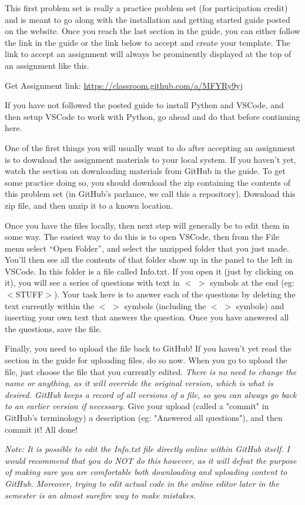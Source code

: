 \documentclass[letterpaper,12pt]{exam}
\begin{document}
	This first problem set is really a practice problem set (for participation credit) and is meant to go along with the installation and getting started guide posted on the website. Once you reach the last section in the guide, you can either follow the link in the guide or the link below to accept and create your template. The link to accept an assignment will always be prominently displayed at the top of an assignment like this.
	\begin{center}
		Get Assignment link: \url{https://classroom.github.com/a/MFYRy9yj}
	\end{center}
\begin{questions}
	\begin{question}
		If you have not followed the posted guide to install Python and VSCode, and then setup VSCode to work with Python, go ahead and do that before continuing here.

One of the first things you will usually want to do after accepting an assignment is to download the assignment materials to your local system. If you haven't yet, watch the section on downloading materials from GitHub in the guide. To get some practice doing so, you should download the zip containing the contents of this problem set (in GitHub's parlance, we call this a repository). Download this zip file, and then unzip it to a known location.

Once you have the files locally, then next step will generally be to edit them in some way. The easiest way to do this is to open VSCode, then from the File menu select ``Open Folder'', and select the unzipped folder that you just made. You'll then see all the contents of that folder show up in the panel to the left in VSCode. In this folder is a file called Info.txt. If you open it (just by clicking on it), you will see a series of questions with text in $<$ $>$ symbols at the end (eg: $<$STUFF$>$). Your task here is to answer each of the questions by deleting the text currently within the $<$ $>$ symbols (including the $<$ $>$ symbols) and inserting your own text that answers the question. Once you have answered all the questions, save the file.

Finally, you need to upload the file back to GitHub! If you haven't yet read the section in the guide for uploading files, do so now. When you go to upload the file, just choose the file that you currently edited. \emph{There is no need to change the name or anything, as it will override the original version, which is what is desired. GitHub keeps a record of all versions of a file, so you can always go back to an earlier version if necessary.} Give your upload (called a "commit" in GitHub's terminology) a description (eg: "Answered all questions"), and then commit it! All done!

\emph{Note: It is possible to edit the Info.txt file directly online within GitHub itself. I would recommend that you do NOT do this however, as it will defeat the purpose of making sure you are comfortable both downloading and uploading content to GitHub. Moreover, trying to edit actual code in the online editor later in the semester is an almost surefire way to make mistakes.}
	\end{question}
\end{questions}
\end{document}
